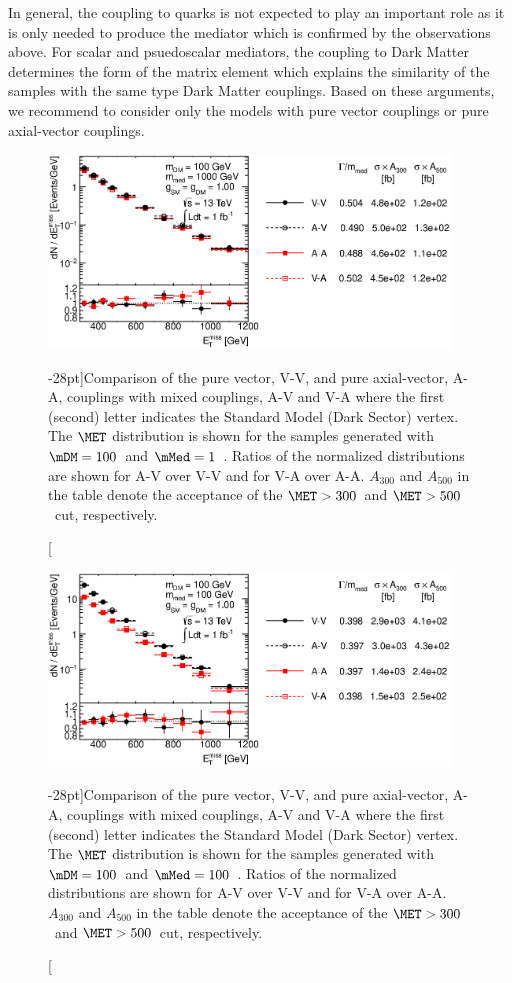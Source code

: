 In general, the coupling to quarks is not expected to play an important role as it is only needed to produce the mediator which is confirmed by the observations above. For scalar and psuedoscalar mediators, the coupling to Dark Matter determines the form of the matrix element which explains the similarity of the samples with the same type Dark Matter couplings. 
Based on these arguments, we recommend to consider only the models with pure vector couplings or pure axial-vector couplings.

\begin{figure}
\centering
\includegraphics[width=0.95\textwidth]{figures/monojet/compareVA_100_1000.eps}
\caption[][-28pt]{Comparison of the pure vector, V-V, and pure axial-vector, A-A, couplings with mixed couplings, A-V and V-A where the first (second) letter indicates the Standard Model (Dark Sector) vertex. The $\MET$ distribution is shown for the samples generated with $\mDM=100$~\gev and $\mMed=1$~\tev. Ratios of the normalized distributions are shown for A-V over V-V and for V-A over A-A. $A_{300}$ and $A_{500}$ in the table denote the acceptance of the $\MET>300$~\gev and $\MET>500$~\gev cut, respectively.}
\label{fig:monojet_scan_VA_mMed1000}
\end{figure}

\begin{figure}
\centering
\includegraphics[width=0.95\textwidth]{figures/monojet/compareVA_100_100.eps}
\caption[][-28pt]{Comparison of the pure vector, V-V, and pure axial-vector, A-A, couplings with mixed couplings, A-V and V-A where the first (second) letter indicates the Standard Model (Dark Sector) vertex. The $\MET$ distribution is shown for the samples generated with $\mDM=100$~\gev and $\mMed=100$~\gev. Ratios of the normalized distributions are shown for A-V over V-V and for V-A over A-A. $A_{300}$ and $A_{500}$ in the table denote the acceptance of the $\MET>300$~\gev and $\MET>500$~\gev cut, respectively.}
\label{fig:monojet_scan_VA_mMed100}
\end{figure}


